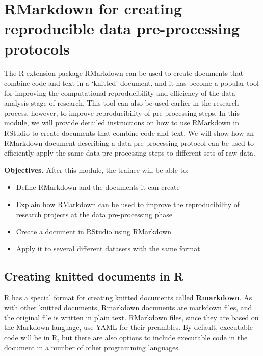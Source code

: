 \documentclass[]{tufte-book}
\providecommand{\tightlist}{%
  \setlength{\itemsep}{0pt}\setlength{\parskip}{0pt}}
\begin{document}
\hypertarget{rmarkdown-for-creating-reproducible-data-pre-processing-protocols}{%
\section{RMarkdown for creating reproducible data pre-processing protocols}\label{rmarkdown-for-creating-reproducible-data-pre-processing-protocols}}

The R extension package RMarkdown can be used to create documents that combine
code and text in a `knitted' document, and it has become a popular tool for
improving the computational reproducibility and efficiency of the data analysis
stage of research. This tool can also be used earlier in the research process,
however, to improve reproducibility of pre-processing steps. In this module, we
will provide detailed instructions on how to use RMarkdown in RStudio to create
documents that combine code and text. We will show how an RMarkdown document
describing a data pre-processing protocol can be used to efficiently apply the
same data pre-processing steps to different sets of raw data.

\textbf{Objectives.} After this module, the trainee will be able to:

\begin{itemize}
\tightlist
\item
  Define RMarkdown and the documents it can create
\item
  Explain how RMarkdown can be used to improve the reproducibility of research
  projects at the data pre-processing phase
\item
  Create a document in RStudio using RMarkdown
\item
  Apply it to several different datasets with the same format
\end{itemize}

\hypertarget{creating-knitted-documents-in-r}{%
\subsection{Creating knitted documents in R}\label{creating-knitted-documents-in-r}}

R has a special format for creating knitted documents called \textbf{Rmarkdown}. As
with other knitted documents, Rmarkdown documents are markdown files, and the
original file is written in plain text. RMarkdown files, since they are based on
the Markdown language, use YAML for their preambles. By default, executable code
will be in R, but there are also options to include executable code in the
document in a number of other programming languages.
\end{document}
